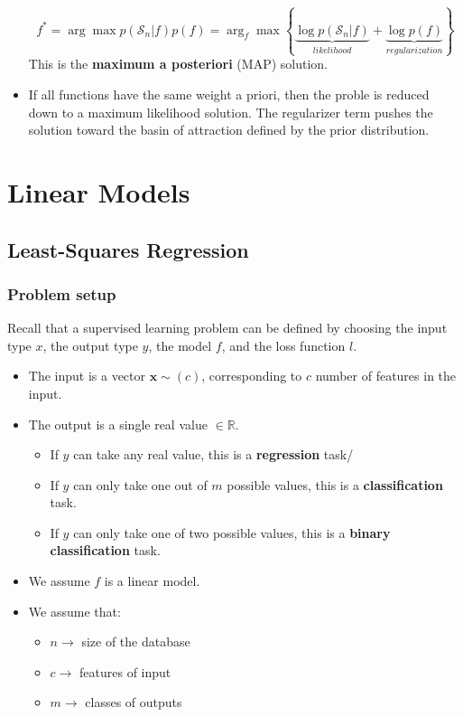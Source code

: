 \documentclass{article}
\newcommand{\tbf}[1]{\textbf{#1}}
\newcommand{\mbf}[1]{\mathbf{#1}}
\begin{document}
\begin{itemize}
        \[f^* = \arg \max p(\mathcal{S}_n | f)p(f) = \arg _f \max \left\{\underbrace{\log p(\mathcal{S}_n|f)}_{likelihood} + \underbrace{\log p(f)}_{regularization} \right\} \]
        This is the \tbf{maximum a posteriori} (MAP) solution. 
        \item If all functions have the same weight a priori, then the proble is reduced down to a maximum likelihood solution. The regularizer term pushes the solution toward the basin of attraction defined by the prior distribution.
    \end{itemize}

    \section{Linear Models}

    \subsection{Least-Squares Regression}

    \subsubsection{Problem setup}
        
    Recall that a supervised learning problem can be defined by choosing the input type $x$, the output type $y$, the model $f$, and the loss function $l$.
    
    \begin{itemize}
        \item The input is a vector $\mbf{x} \sim (c)$, corresponding to $c$ number of features in the input.
        \item The output is a single real value $\in \mathbb{R}$. 
        \begin{itemize}
            \item If $y$ can take any real value, this is a \tbf{regression} task/
            \item If $y$ can only take one out of $m$ possible values, this is a \tbf{classification} task.
            \item If $y$ can only take one of two possible values, this is a \tbf{binary classification} task.
        \end{itemize}
        \item We assume $f$ is a linear model.
        \item We assume that:
        \begin{itemize}
            \item $n \rightarrow$ size of the database
            \item $c \rightarrow$ features of input
            \item $m \rightarrow$ classes of outputs
        \end{itemize}
    \end{itemize}
\end{document}
